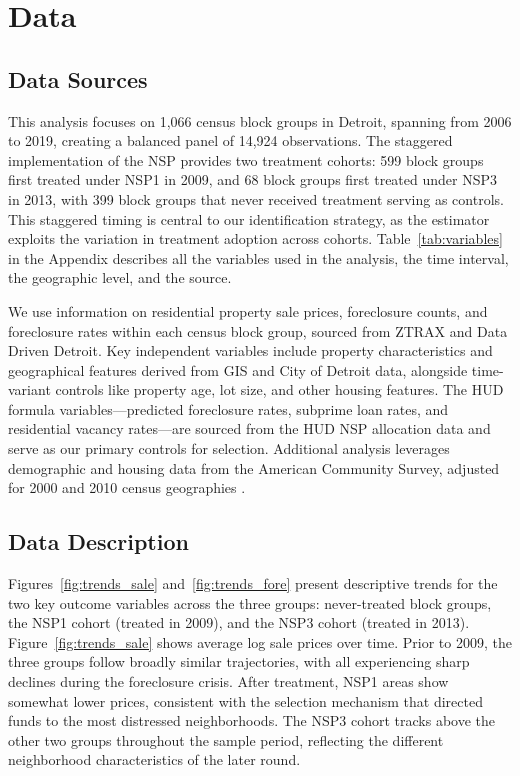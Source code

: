 \documentclass[12pt,authoryear]{elsarticle}
\begin{document}
\section{Data}
\label{sec:data}

\subsection{Data Sources}

This analysis focuses on 1,066 census block groups in Detroit, spanning from 2006 to 2019, creating a balanced panel of 14,924 observations. The staggered implementation of the NSP provides two treatment cohorts: 599 block groups first treated under NSP1 in 2009, and 68 block groups first treated under NSP3 in 2013, with 399 block groups that never received treatment serving as controls. This staggered timing is central to our identification strategy, as the \citet{callaway2021} estimator exploits the variation in treatment adoption across cohorts. Table~\ref{tab:variables} in the Appendix describes all the variables used in the analysis, the time interval, the geographic level, and the source.

We use information on residential property sale prices, foreclosure counts, and foreclosure rates within each census block group, sourced from ZTRAX \citep{zillow2020} and Data Driven Detroit. Key independent variables include property characteristics and geographical features derived from GIS and City of Detroit data, alongside time-variant controls like property age, lot size, and other housing features. The HUD formula variables---predicted foreclosure rates, subprime loan rates, and residential vacancy rates---are sourced from the HUD NSP allocation data \citep{hud2008} and serve as our primary controls for selection. Additional analysis leverages demographic and housing data from the American Community Survey, adjusted for 2000 and 2010 census geographies \citep{logan2014}.

\subsection{Data Description}

Figures~\ref{fig:trends_sale} and~\ref{fig:trends_fore} present descriptive trends for the two key outcome variables across the three groups: never-treated block groups, the NSP1 cohort (treated in 2009), and the NSP3 cohort (treated in 2013). Figure~\ref{fig:trends_sale} shows average log sale prices over time. Prior to 2009, the three groups follow broadly similar trajectories, with all experiencing sharp declines during the foreclosure crisis. After treatment, NSP1 areas show somewhat lower prices, consistent with the selection mechanism that directed funds to the most distressed neighborhoods. The NSP3 cohort tracks above the other two groups throughout the sample period, reflecting the different neighborhood characteristics of the later round.
\end{document}
